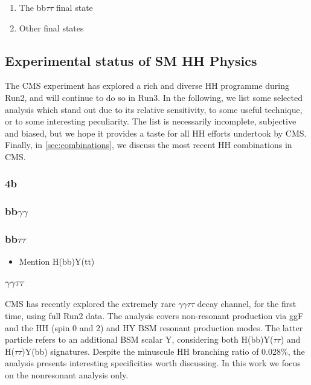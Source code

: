 \documentclass[11pt]{article}
\begin{document}
\begin{enumerate}
\item The bb\(\tau \tau\) final state
\label{sec:orga4a5949}

\item Other final states
\label{sec:orga404ef7}
\end{enumerate}

\subsection{Experimental status of SM HH Physics}
\label{sec:org425a921}
The \ac{CMS} experiment has explored a rich and diverse HH programme during Run2, and will continue to do so in Run3.
In the following, we list some selected analysis which stand out due to its relative sensitivity, to some useful technique, or to some interesting peculiarity.
The list is necessarily incomplete, subjective and biased, but we hope it provides a taste for all HH efforts undertook by \ac{CMS}.
Finally, in \cref{sec:combinations}, we discuss the most recent HH combinations in \ac{CMS}.

\subsubsection{4b}
\label{sec:orgae43e4e}
\label{sec:bbbb}
\subsubsection{bb\(\gamma \gamma\)}
\label{sec:orgf1f7949}
\label{sec::bbgg}
\subsubsection{bb\(\tau \tau\)}
\label{sec:orgf99dfec}
\label{sec::bbtautau}


\begin{itemize}
\item Mention H(bb)Y(tt)
\end{itemize}
\subsubsection{\(\gamma \gamma \tau \tau\)}
\label{sec:org1efeb7a}
\ac{CMS} has recently explored the extremely rare \(\gamma \gamma \tau \tau\) decay channel, for the first time, using full Run2 data.
The analysis covers non-resonant production via \ac{ggF} and the HH (spin 0 and 2) and HY \ac{BSM} resonant production modes.
The latter particle refers to an additional BSM scalar Y, considering both H(bb)Y(\(\tau \tau\)) and H(\(\tau \tau\))Y(bb) signatures.
Despite the minuscule HH branching ratio of 0.028\%, the analysis presents interesting specificities worth discussing.
In this work we focus on the nonresonant analysis only.
\end{document}
